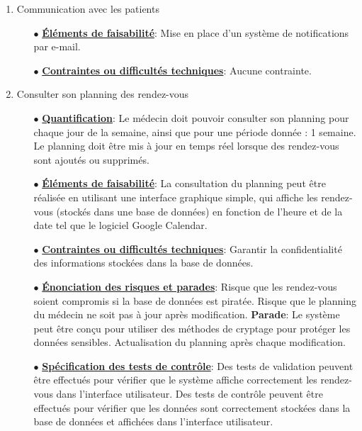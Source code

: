 \documentclass[a4paper]{book}
\begin{document}
\begin{enumerate}
    \item Communication avec les patients\newline
    \begin{itemize}
        \item[$\bullet$] \textbf{\underline{Éléments de faisabilité}}: Mise en place d’un système de notifications par e-mail. 
        \item[$\bullet$] \textbf{\underline{Contraintes ou difficultés techniques}}: Aucune contrainte. \newline
    \end{itemize}

    \item Consulter son planning des rendez-vous\newline
    \begin{itemize}
        \item[$\bullet$] \textbf{\underline{Quantification}}: Le médecin doit pouvoir consulter son planning pour chaque jour de la semaine, ainsi que pour une période donnée : 1 semaine.
		Le planning doit être mis à jour en temps réel lorsque des rendez-vous sont ajoutés ou supprimés.
        \item[$\bullet$] \textbf{\underline{Éléments de faisabilité}}: La consultation du planning peut être réalisée en utilisant une interface graphique simple, qui affiche les rendez-vous (stockés dans une base de données) 
        en fonction de l'heure et de la date tel que le logiciel Google Calendar.
        \item[$\bullet$] \textbf{\underline{Contraintes ou difficultés techniques}}: Garantir la confidentialité des informations stockées dans la base de données.
        \item[$\bullet$] \textbf{\underline{Énonciation des risques et parades}}:  Risque que les rendez-vous soient compromis si la base de données est piratée. Risque que le planning du médecin ne soit pas à jour après modification.\newline
        \textbf{Parade}: Le système peut être conçu pour utiliser des méthodes de cryptage pour protéger les données sensibles. Actualisation du planning après chaque modification.
        \item[$\bullet$] \textbf{\underline{Spécification des tests de contrôle}}: Des tests de validation peuvent être effectués pour vérifier que le système affiche correctement les rendez-vous dans l'interface utilisateur. Des tests de contrôle peuvent être effectués pour vérifier que les données sont correctement stockées dans la base de données et affichées dans l'interface utilisateur.\newline
    \end{itemize} 


\end{enumerate}
\end{document}

